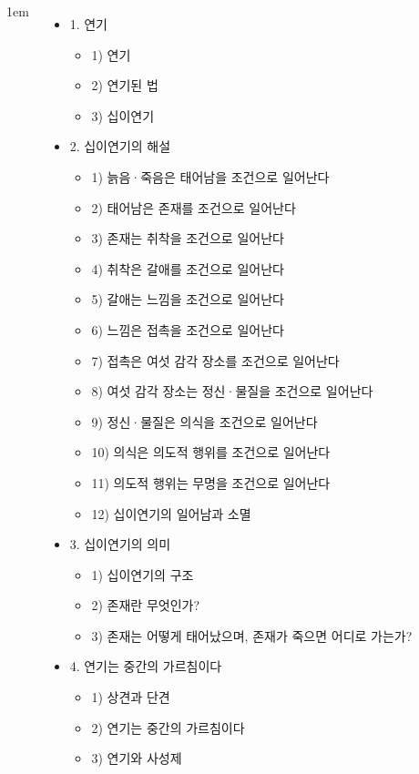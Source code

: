 \documentclass[	17pt, 
							a1paper, 
							portrait, %
							margin=0mm, %
							innermargin=10mm,  		%
							colspace=5mm, 
							subcolspace=0mm
							]{tikzposter}
\begin{document}
\begin{columns}
			{
					\setlength{\leftmargini}{2em}
					\setlength{\labelsep} {1em}
					\begin{itemize}
					\item 1. 연기
						\begin{itemize}
						\item 1) 연기
						\item 2) 연기된 법
						\item 3) 십이연기
						\end{itemize}

					\item 2. 십이연기의 해설
						\begin{itemize}
						\item 1) 늙음·죽음은 태어남을 조건으로 일어난다
						\item 2) 태어남은 존재를 조건으로 일어난다
						\item 3) 존재는 취착을 조건으로 일어난다
						\item 4) 취착은 갈애를 조건으로 일어난다
						\item 5) 갈애는 느낌을 조건으로 일어난다
						\item 6) 느낌은 접촉을 조건으로 일어난다
						\item 7) 접촉은 여섯 감각 장소를 조건으로 일어난다
						\item 8) 여섯 감각 장소는 정신·물질을 조건으로 일어난다
						\item 9) 정신·물질은 의식을 조건으로 일어난다
						\item 10) 의식은 의도적 행위를 조건으로 일어난다
						\item 11) 의도적 행위는 무명을 조건으로 일어난다
						\item 12) 십이연기의 일어남과 소멸
						\end{itemize}

					\item 3. 십이연기의 의미
						\begin{itemize}
						\item 1) 십이연기의 구조
						\item 2) 존재란 무엇인가?
						\item 3) 존재는 어떻게 태어났으며, 존재가 죽으면 어디로 가는가?
						\end{itemize}

					\item 4. 연기는 중간의 가르침이다
						\begin{itemize}
						\item 1) 상견과 단견
						\item 2) 연기는 중간의 가르침이다
						\item 3) 연기와 사성제
						\end{itemize}


\end{itemize}}
\end{columns}
\end{document}

